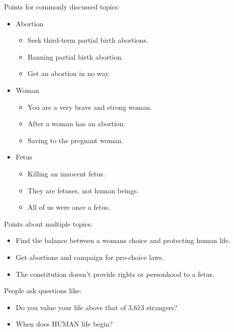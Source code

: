 \documentclass[tikz]{article}
\begin{document}
\begin{multicols}{2}
    Points for commonly discussed topics:
    \begin{itemize}[noitemsep,nolistsep,label={}]
      \item{Abortion}
        \begin{itemize}[noitemsep,nolistsep,label={}]
          \item{Seek third-term partial birth abortions.}
          \item{Banning partial birth abortion.}
          \item{Get an abortion in no way.}
        \end{itemize}
      \item{Woman}
        \begin{itemize}[noitemsep,nolistsep,label={}]
          \item{You are a very brave and strong woman.}
          \item{After a woman has an abortion.}
          \item{Saving to the pregnant woman.}
        \end{itemize}
      \item{Fetus}
        \begin{itemize}[noitemsep,nolistsep,label={}]
          \item{Killing an innocent fetus.}
          \item{They are fetuses, not human beings.}
          \item{All of us were once a fetus.}
        \end{itemize}
    \end{itemize}

    Points about multiple topics:
    \begin{itemize}[noitemsep,nolistsep,label={}]
          \item{Find the balance between a womans choice and protecting human life.}
          \item{Get abortions and campaign for pro-choice laws.}
          \item{The constitution doesn't provide rights or personhood to a fetus.}
    \end{itemize}

    People ask questions like:
    \begin{itemize}[noitemsep,nolistsep,label={}]
          \item{Do you value your life above that of 3,613 strangers?}
          \item{When does HUMAN life begin?}
    \end{itemize}


\end{multicols}
\end{document}
